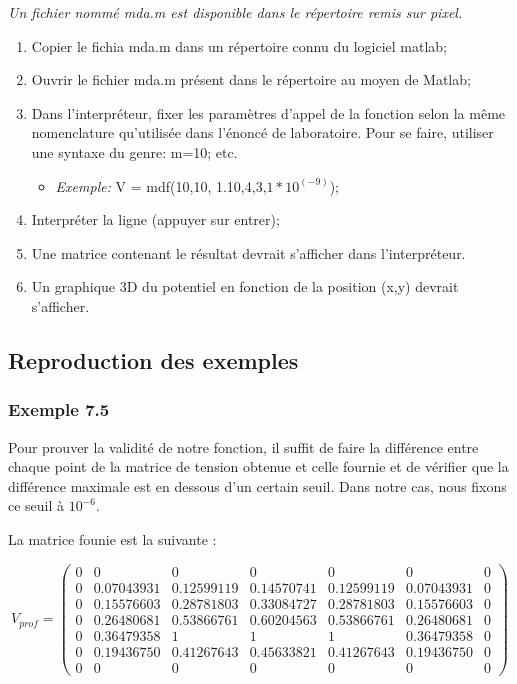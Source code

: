 \textit{Un fichier nommé mda.m est disponible dans le répertoire remis sur pixel.}
\begin{enumerate}
\item Copier le fichia mda.m dans un répertoire connu du logiciel matlab;
\item Ouvrir le fichier mda.m présent dans le répertoire au moyen de Matlab;
\item Dans l'interpréteur, fixer les paramètres d'appel de la fonction selon la même nomenclature qu'utilisée dans l'énoncé de laboratoire. Pour se faire, utiliser une syntaxe du genre: m=10; etc. 
\begin{itemize}
\item \textit{Exemple:} V = mdf(10,10, 1.10,4,3,$1*10^{(-9)}$);
\end{itemize}
\item Interpréter la ligne (appuyer sur entrer);
\item Une matrice contenant le résultat devrait s'afficher dans l'interpréteur. 
\item Un graphique 3D du potentiel en fonction de la position (x,y) devrait s'afficher.
\end{enumerate}

\subsection{Reproduction des exemples}
\subsubsection{Exemple 7.5}
Pour prouver la validité de notre fonction, il suffit de faire la différence entre chaque point de la matrice de tension obtenue et celle fournie et de vérifier que la différence maximale est en dessous d'un certain seuil. Dans notre cas, nous fixons ce seuil à $10^{-6}$.

La matrice founie est la suivante :

\[V_{prof}  = \left(\begin{array}{ccccccc}
0 & 0 			& 0 			& 0 			& 0 			& 0 			& 0 \\
0 & 0.07043931 	& 0.12599119 	& 0.14570741	& 0.12599119	& 0.07043931 	& 0 \\
0 & 0.15576603 	& 0.28781803 	& 0.33084727 	& 0.28781803 	& 0.15576603 	& 0 \\
0 & 0.26480681 	& 0.53866761 	& 0.60204563  	& 0.53866761 	& 0.26480681 	& 0 \\
0 & 0.36479358 	& 1				& 1				& 1			 	& 0.36479358 	& 0 \\
0 & 0.19436750 	& 0.41267643 	& 0.45633821	& 0.41267643 	& 0.19436750 	& 0 \\
0 & 0 			& 0 			& 0 			& 0 			& 0 			& 0 
\end{array} \right)\]

